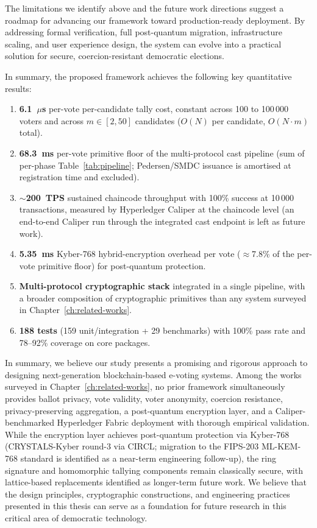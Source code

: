 The limitations we identify above and the future work directions suggest a roadmap for advancing our framework toward production-ready deployment. By addressing formal verification, full post-quantum migration, infrastructure scaling, and user experience design, the system can evolve into a practical solution for secure, coercion-resistant democratic elections.

In summary, the proposed framework achieves the following key quantitative results:

\begin{enumerate}
    \item \textbf{6.1~$\mu$s} per-vote per-candidate tally cost, constant across 100 to 100\,000 voters and across $m \in [2,50]$ candidates ($O(N)$ per candidate, $O(N \cdot m)$ total).
    \item \textbf{68.3~ms} per-vote primitive floor of the multi-protocol cast pipeline (sum of per-phase Table~\ref{tab:pipeline}; Pedersen/SMDC issuance is amortised at registration time and excluded).
    \item \textbf{$\sim$200~TPS} sustained chaincode throughput with 100\% success at 10\,000 transactions, measured by Hyperledger Caliper at the chaincode level (an end-to-end Caliper run through the integrated cast endpoint is left as future work).
    \item \textbf{5.35~ms} Kyber-768 hybrid-encryption overhead per vote ($\approx$7.8\% of the per-vote primitive floor) for post-quantum protection.
    \item \textbf{Multi-protocol cryptographic stack} integrated in a single pipeline, with a broader composition of cryptographic primitives than any system surveyed in Chapter~\ref{ch:related-works}.
    \item \textbf{188 tests} (159 unit/integration + 29 benchmarks) with 100\% pass rate and 78--92\% coverage on core packages.
\end{enumerate}

In summary, we believe our study presents a promising and rigorous approach to designing next-generation blockchain-based e-voting systems. Among the works surveyed in Chapter~\ref{ch:related-works}, no prior framework simultaneously provides ballot privacy, vote validity, voter anonymity, coercion resistance, privacy-preserving aggregation, a post-quantum encryption layer, and a Caliper-benchmarked Hyperledger Fabric deployment with thorough empirical validation. While the encryption layer achieves post-quantum protection via Kyber-768 (CRYSTALS-Kyber round-3 via CIRCL; migration to the FIPS-203 ML-KEM-768 standard is identified as a near-term engineering follow-up), the ring signature and homomorphic tallying components remain classically secure, with lattice-based replacements identified as longer-term future work. We believe that the design principles, cryptographic constructions, and engineering practices presented in this thesis can serve as a foundation for future research in this critical area of democratic technology.
